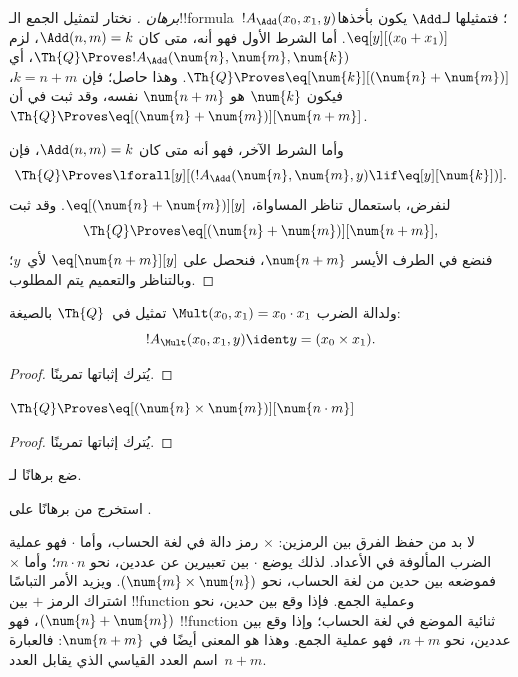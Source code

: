 \documentclass[../../../include/open-logic-section]{subfiles}
\begin{document}
\begin{proof}[برهان ]
نختار لتمثيل الجمع الـ!!{formula}~$!A_\Add(x_0,x_1,y)$؛ فتمثيلها
لـ$\Add$ يكون بأخذها $\eq[y][(x_0+x_1)]$.
أما الشرط الأول فهو أنه، متى كان $\Add(n,m)=k$، لزم
$\Th{Q}\Proves !A_\Add(\num{n},\num{m},\num{k})$، أي
$\Th{Q}\Proves\eq[\num{k}][(\num{n}+\num{m})]$.
وهذا حاصل؛ فإن $k=n+m$، فيكون $\num{k}$ هو $\num{n+m}$ نفسه،
وقد ثبت في  أن
$\Th{Q}\Proves\eq[(\num{n}+\num{m})][\num{n+m}]$.

وأما الشرط الآخر، فهو أنه متى كان $\Add(n,m)=k$، فإن
\[
\Th{Q} \Proves \lforall[y][(!A_\Add(\num{n}, \num{m}, y) \lif
  \eq[y][\num{k}])].
\]
لنفرض، باستعمال تناظر المساواة، $\eq[(\num{n}+\num{m})][y]$. وقد ثبت
\[
\Th{Q} \Proves \eq[(\num{n}+\num{m})][\num{n+m}],
\]
فنضع في الطرف الأيسر $\num{n+m}$، فنحصل على
$\eq[\num{n+m}][y]$ لأي~$y$؛ وبالتناظر والتعميم يتم المطلوب.
\end{proof}

\begin{prop}
ولدالة الضرب
$\Mult(x_0,x_1)=x_0\cdot x_1$ تمثيل في~$\Th{Q}$ بالصيغة:
\[
  !A_{\Mult}(x_0, x_1, y) \ident y = (x_0 \times x_1).
\]
\end{prop}

\begin{proof} يُترك إثباتها تمرينًا. \end{proof}

\begin{lem}
$\Th{Q} \Proves \eq[(\num{n} \times \num{m})][\num{n \cdot m}]$
\end{lem}

\begin{proof} يُترك إثباتها تمرينًا. \end{proof}

\begin{prob}
ضع برهانًا لـ.
\end{prob}

\begin{prob}
استخرج من  برهانًا على
.
\end{prob}

\begin{explain}
  لا بد من حفظ الفرق بين الرمزين: $\times$ رمز دالة في لغة الحساب،
  وأما $\cdot$ فهو عملية الضرب المألوفة في الأعداد.
  لذلك يوضع $\cdot$ بين تعبيرين عن عددين، نحو $m\cdot n$؛
  وأما $\times$ فموضعه بين حدين من لغة الحساب، نحو
  $(\num{m}\times\num{n})$. ويزيد الأمر التباسًا اشتراك الرمز $+$
  بين !!{function} وعملية الجمع. فإذا وقع بين حدين،
  نحو $(\num{n}+\num{m})$، فهو !!{function} ثنائية الموضع في لغة الحساب؛
  وإذا وقع بين عددين، نحو $n+m$، فهو عملية الجمع.
  وهذا هو المعنى أيضًا في $\num{n+m}$: فالعبارة اسم العدد القياسي الذي
  يقابل العدد~$n+m$.
\end{explain}
\end{document}
